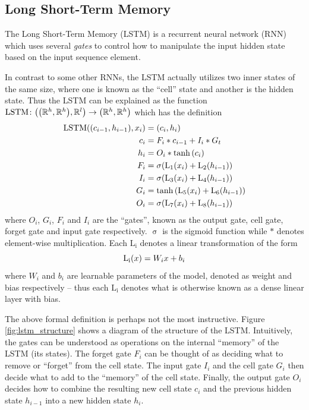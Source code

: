 \subsection{Long Short-Term Memory}
The Long Short-Term Memory (LSTM) is a recurrent neural network (RNN) which uses several \textit{gates} to control how to manipulate the input hidden state based on the input sequence element.

In contrast to some other RNNs, the LSTM actually utilizes two inner states of the same size, where one is known as the ``cell'' state and another is the hidden state. Thus the LSTM can be explained as the function $\mathrm{LSTM} \colon {\mathopen{} \left( {\mathopen{} \left( \mathbb{R}^h, \mathbb{R}^h \right) \mathclose{}}, \mathbb{R}^l \right) \mathclose{}} \to {\mathopen{} \left( \mathbb{R}^h, \mathbb{R}^h \right) \mathclose{}}$ which has the definition \cite{pytorchnn}
\begin{align*}
    \mathrm{LSTM}{\mathopen{} \left( {\mathopen{} \left( c_{i - 1}, h_{i - 1} \right) \mathclose{}}, x_i \right) \mathclose{}} &= {\mathopen{} \left( c_i, h_i \right) \mathclose{}} \\
    c_i &= F_i * c_{i - 1} + I_i * G_t \\
    h_i &= O_i * \tanh{\mathopen{} \left( c_i \right) \mathclose{}} \\
    F_i &= \mathrm{\sigma}{\mathopen{} \left( \mathrm{L_1}{\mathopen{} \left( x_i \right) \mathclose{}} + \mathrm{L_2}{\mathopen{} \left( h_{i - 1} \right) \mathclose{}} \right) \mathclose{}} \\
    I_i &= \mathrm{\sigma}{\mathopen{} \left( \mathrm{L_3}{\mathopen{} \left( x_i \right) \mathclose{}} + \mathrm{L_4}{\mathopen{} \left( h_{i - 1} \right) \mathclose{}} \right) \mathclose{}} \\
    G_i &= \tanh{\mathopen{} \left( \mathrm{L_5}{\mathopen{} \left( x_i \right) \mathclose{}} + \mathrm{L_6}{\mathopen{} \left( h_{i - 1} \right) \mathclose{}} \right) \mathclose{}} \\
    O_i &= \mathrm{\sigma}{\mathopen{} \left( \mathrm{L_7}{\mathopen{} \left( x_i \right) \mathclose{}} + \mathrm{L_8}{\mathopen{} \left( h_{i - 1} \right) \mathclose{}} \right) \mathclose{}}
\end{align*}
where $O_i$, $G_i$, $F_i$ and $I_i$ are the ``gates'', known as the output gate, cell gate, forget gate and input gate respectively. $\operatorname{\sigma}$ is the sigmoid function while $*$ denotes element-wise multiplication. Each $\mathrm{L_i}$ denotes a linear transformation of the form
\[\mathrm{L_i}{\mathopen{} \left( x \right) \mathclose{}} = W_i x + b_i\]
where $W_i$ and $b_i$ are learnable parameters of the model, denoted as weight and bias respectively -- thus each $\mathrm{L_i}$ denotes what is otherwise known as a dense linear layer with bias.

The above formal definition is perhaps not the most instructive. Figure \ref{fig:lstm_structure} shows a diagram of the structure of the LSTM. Intuitively, the gates can be understood as operations on the internal ``memory'' of the LSTM (its states). The forget gate $F_i$ can be thought of as deciding what to remove or ``forget'' from the cell state. The input gate $I_i$ and the cell gate $G_i$ then decide what to add to the ``memory'' of the cell state. Finally, the output gate $O_i$ decides how to combine the resulting new cell state $c_i$ and the previous hidden state $h_{i - 1}$ into a new hidden state $h_i$.

